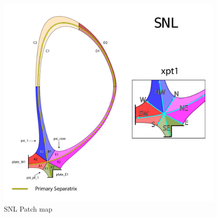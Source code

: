 \begin{figure}[H]
    \centering
        \includegraphics[width=\textwidth]{figures/configurations/SNL_collection.pdf}
        \caption{SNL Patch map}
        \label{fig:snl_patch_map}
\end{figure}

